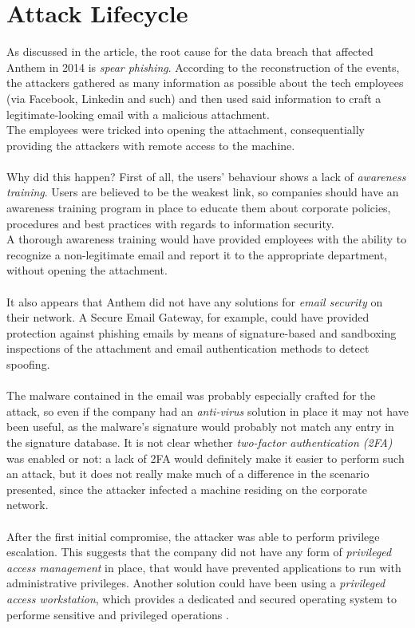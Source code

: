\documentclass[a4paper]{article}
\begin{document}
	\section{Attack Lifecycle}
	As discussed in the article, the root cause for the data breach that affected Anthem in 2014 is \textit{spear phishing}. According to the reconstruction of the events, the attackers gathered as many information as possible about the tech employees (via Facebook, Linkedin and such) and then used said information to craft a legitimate-looking email with a malicious attachment. \\
	The employees were tricked into opening the attachment, consequentially providing the attackers with remote access to the machine.\\\\
	Why did this happen? First of all, the users' behaviour shows a lack of \textit{awareness training}. Users are believed to be the weakest link, so companies should have an awareness training program in place to educate them about corporate policies, procedures and best practices with regards to information security.\\
	A thorough awareness training would have provided employees with the ability to recognize a non-legitimate email and report it to the appropriate department, without opening the attachment.\\\\
	It also appears that Anthem did not have any solutions for \textit{email security} on their network. A Secure Email Gateway, for example, could have provided protection against phishing emails by means of signature-based and sandboxing inspections of the attachment and email authentication methods to detect spoofing.\\\\
	The malware contained in the email was probably especially crafted for the attack, so even if the company had an \textit{anti-virus} solution in place it may not have been useful, as the malware's signature would probably not match any entry in the signature database. It is not clear whether \textit{two-factor authentication (2FA)} was enabled or not: a lack of 2FA would definitely make it easier to perform such an attack, but it does not really make much of a difference in the scenario presented, since the attacker infected a machine residing on the corporate network.\\\\
	After the first initial compromise, the attacker was able to perform privilege escalation. This suggests that the company did not have any form of \textit{privileged access management} in place, that would have prevented applications to run with administrative privileges. Another solution could have been using a \textit{privileged access workstation}, which provides a dedicated and secured operating system to performe sensitive and privileged operations \cite{paws}.\\\\
\end{document}
